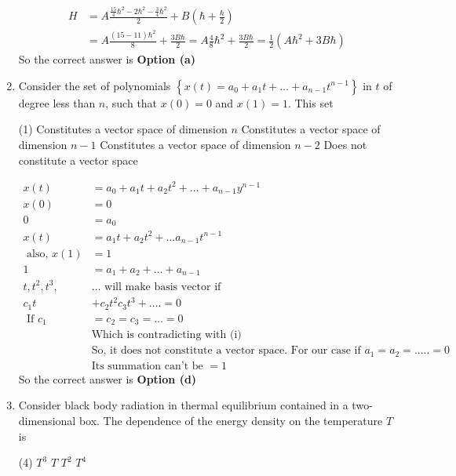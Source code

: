\begin{enumerate}
\begin{answer}
\begin{align*}
	H&=A \frac{\frac{15}{4} \hbar^{2}-2 \hbar^{2}-\frac{3}{4} \hbar^{2}}{2}+B\left(\hbar+\frac{\hbar}{2}\right) \\
	&=A \frac{(15-11) \hbar^{2}}{8}+\frac{3 B \hbar}{2}=A \frac{4}{8} \hbar^{2}+\frac{3 B \hbar}{2}=\frac{1}{2}\left(A \hbar^{2}+3 B \hbar\right)
	\end{align*}
		So the correct answer is \textbf{Option (a)}
\end{answer}
\item  Consider the set of polynomials $\left\{x(t)=a_{0}+a_{1} t+\ldots+a_{n-1} t^{n-1}\right\}$ in $t$ of degree less than $n$, such that $x(0)=0$ and $x(1)=1$. This set
 \begin{tasks}(1)
	\task[\textbf{a.}]Constitutes a vector space of dimension $n$
	\task[\textbf{b.}]Constitutes a vector space of dimension $n-1$
	\task[\textbf{c.}]Constitutes a vector space of dimension $n-2$
	\task[\textbf{d.}]Does not constitute a vector space	
\end{tasks}
\begin{answer}
	\begin{align*}
	x(t)&=a_{0}+a_{1} t+a_{2} t^{2}+\ldots+a_{n-1} y^{n-1}\\
	x(0)&=0 \\
	0&=a_{0} \\
	x(t)&=a_{1} t+a_{2} t^{2}+\ldots a_{n-1} t^{n-1}\\
\text{	also, }x(1)&=1\\
	1&=a_{1}+a_{2}+\ldots+a_{n-1}\\
	t, t^{2}, t^{3},& \ldots \text { will make basis vector if }\\
	c_{1} t&+c_{2} t^{2} c_{3} t^{3}+\ldots .=0\\
\text{	If }c_{1}&=c_{2}=c_{3}=\ldots=0\\
&\text{Which is contradicting with (i)}\\
&\text{So, it does not constitute a vector space. For our case if $a_1=a_2=.....=0$}\\
&\text{Its summation can't be }=1
	\end{align*}
		So the correct answer is \textbf{Option (d)}
\end{answer}
\item Consider black body radiation in thermal equilibrium contained in a two-dimensional box. The dependence of the energy density on the temperature $T$ is
 \begin{tasks}(4)
	\task[\textbf{a.}] $T^{3}$
	\task[\textbf{b.}]$T$
	\task[\textbf{c.}] $T^{2}$
	\task[\textbf{d.}] $T^{4}$
\end{tasks}

\end{enumerate}
